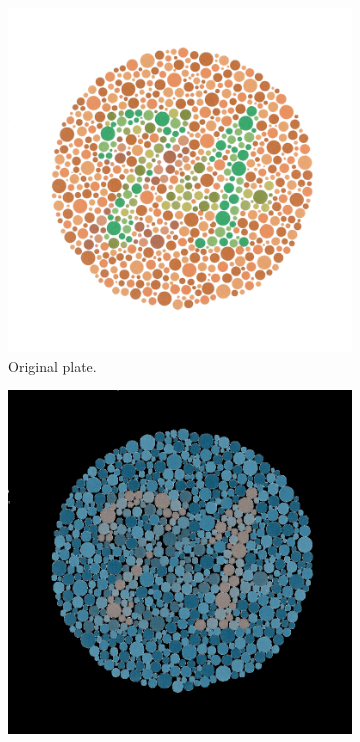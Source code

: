 \documentclass{sig-alternate-05-2015}
\begin{document}
\begin{figure}
    \centering
    \begin{subfigure}[t]{0.48\columnwidth}
        \centering
        \includegraphics[width=\textwidth]{74.png}
        \caption{Original plate.}
    \end{subfigure}
    \begin{subfigure}[t]{0.48\columnwidth}
        \centering
        \includegraphics[width=\textwidth]{74_tritanope_zero.png}

\end{subfigure}
\end{figure}
\end{document}
